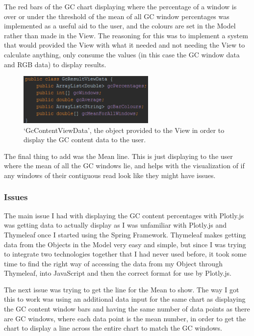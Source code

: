 The red bars of the GC chart displaying where the percentage of a window is over or under the threshold of the mean of all GC window percentages was implemented as a useful aid to the user, and the colours are set in the Model rather than made in the View. The reasoning for this was to implement a system that would provided the View with what it needed and not needing the View to calculate anything, only consume the values (in this case the GC window data and RGB data) to display results.

\begin{figure}[H]
\centering
\includegraphics[width=0.6\textwidth]{images/gcviewdata}
\caption{`GcContentViewData', the object provided to the View in order to display the GC content data to the user.}
\end{figure}

The final thing to add was the Mean line. This is just displaying to the user where the mean of all the GC windows lie, and helps with the visualization of if any windows of their contiguous read look like they might have issues.
\subsubsection{Issues}
The main issue I had with displaying the GC content percentages with Plotly.js was getting data to actually display as I was unfamiliar with Plotly.js and Thymeleaf once I started using the Spring Framework. Thymeleaf makes getting data from the Objects in the Model very easy and simple, but since I was trying to integrate two technologies together that I had never used before, it took some time to find the right way of accessing the data from my Object through Thymeleaf, into JavaScript and then the correct format for use by Plotly.js.

The next issue was trying to get the line for the Mean to show. The way I got this to work was using an additional data input for the same chart as displaying the GC content window bars and having the same number of data points as there are GC windows, where each data point is the mean number, in order to get the chart to display a line across the entire chart to match the GC windows.

